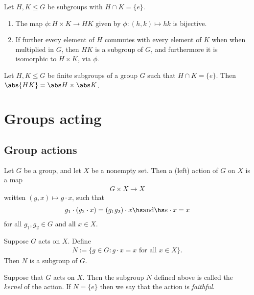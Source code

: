 \documentclass{article}
\begin{document}
\begin{theorem}
	Let $H,K\leq G$ be subgroups with $H\cap K=\{e\}$.
	\begin{enumerate}
		\item The map $\phi:H\times K\to HK$ given by $\phi:(h,k)\mapsto hk$ is bijective.
		\item If further every element of $H$ commutes with every element of $K$ when
		      when multiplied in $G$, then $HK$ is a subgroup of $G$, and
		      furthermore it is isomorphic to $H\times K$, via $\phi$.
	\end{enumerate}
\end{theorem}

\begin{corollary}
	Let $H,K\leq G$ be finite subgroups of a group $G$ such that
	$H\cap K=\{e\}$. Then $\abs{HK} = \abs H \times \abs K$.
\end{corollary}


\section{Groups acting}


\subsection{Group actions}

\begin{definition}
	Let $G$ be a group, and let $X$ be a nonempty set. Then a (left)
	action of $G$ on $X$ is a map
	\begin{align*}
		G\times X \to X
	\end{align*}
	written $(g,x)\mapsto g\cdot x$, such that
	\begin{align*}
		g_1\cdot(g_2\cdot x) = (g_1g_2)\cdot x\hs\text{and}\hs e\cdot x = x
	\end{align*}
	for all $g_1,g_2\in G$ and all $x\in X$.
\end{definition}

\setcounter{theorem}{2}
\begin{proposition}
	Suppose $G$ acts on $X$. Define
	\begin{align*}
		N:=\{g\in G : g\cdot x = x \text{ for all } x\in X\}.
	\end{align*}
	Then $N$ is a subgroup of $G$.
\end{proposition}

\begin{definition}
	Suppose that $G$ acts on $X$. Then the subgroup $N$ defined above
	is called the \emph{kernel} of the action. If $N=\{e\}$ then we say that
	the action is \emph{faithful}.
\end{definition}
\end{document}
